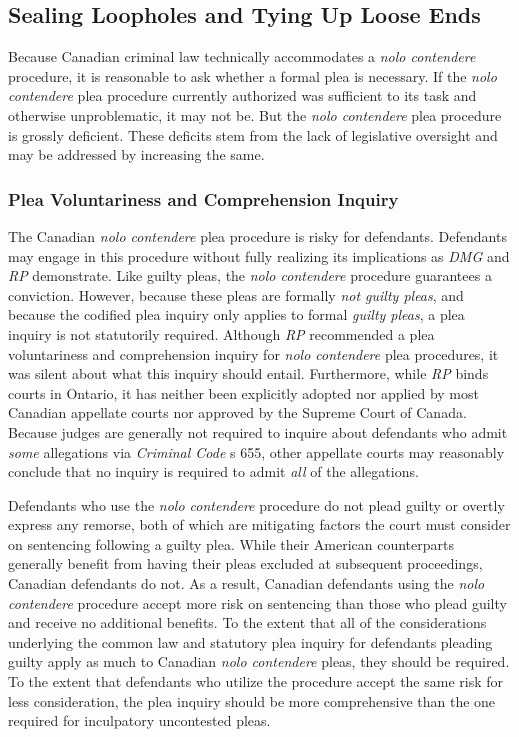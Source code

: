 \subsection{Sealing Loopholes and Tying Up Loose Ends}

Because Canadian criminal law technically accommodates a \textit{nolo contendere} procedure, it is reasonable to ask whether a formal plea is necessary. If the \textit{nolo contendere} plea procedure currently authorized was sufficient to its task and otherwise unproblematic, it may not be. But the \textit{nolo contendere} plea procedure is grossly deficient. These deficits stem from the lack of legislative oversight and may be addressed by increasing the same.

\subsubsection{Plea Voluntariness and Comprehension Inquiry}

The Canadian \textit{nolo contendere} plea procedure is risky for defendants. Defendants may engage in this procedure without fully realizing its implications as \textit{DMG} and \textit{RP} demonstrate. Like guilty pleas, the \textit{nolo contendere} procedure guarantees a conviction. However, because these pleas are formally \textit{not guilty pleas}, and because the codified plea inquiry only applies to formal \textit{guilty pleas}, a plea inquiry is not statutorily required. Although \textit{RP} recommended a plea voluntariness and comprehension inquiry for \textit{nolo contendere} plea procedures, it was silent about what this inquiry should entail. Furthermore, while \textit{RP} binds courts in Ontario, it has neither been explicitly adopted nor applied by most Canadian appellate courts nor approved by the Supreme Court of Canada. Because judges are generally not required to inquire about defendants who admit \textit{some} allegations via \textit{Criminal Code} s 655, other appellate courts may reasonably conclude that no inquiry is required to admit \textit{all} of the allegations. 

Defendants who use the \textit{nolo contendere} procedure do not plead guilty or overtly express any remorse, both of which are mitigating factors the court must consider on sentencing following a guilty plea. While their American counterparts generally benefit from having their pleas excluded at subsequent proceedings, Canadian defendants do not. As a result, Canadian defendants using the \textit{nolo contendere} procedure accept more risk on sentencing than those who plead guilty and receive no additional benefits. To the extent that all of the considerations underlying the common law and statutory plea inquiry for defendants pleading guilty apply as much to Canadian \textit{nolo contendere} pleas, they should be required. To the extent that defendants who utilize the procedure accept the same risk for less consideration, the plea inquiry should be more comprehensive than the one required for inculpatory uncontested pleas.


